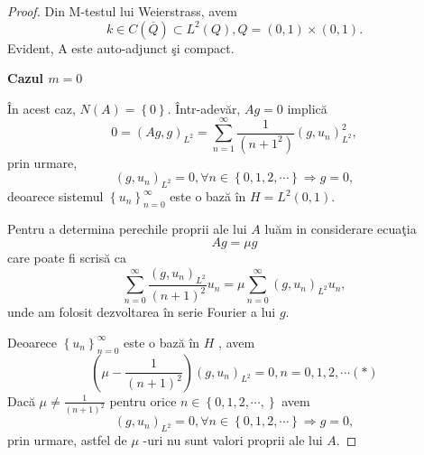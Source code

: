 \documentclass[a4paper,12pt,oneside]{report}
\begin{document}
\begin{proof}
Din M-testul lui Weierstrass, avem
\begin{displaymath}
  k \in C\left ( \overline{Q} \right ) \subset L^{2}\left ( Q \right ), Q = \left ( 0,1 \right )\times \left ( 0,1 \right ).
\end{displaymath}
Evident, A este auto-adjunct \c{s}i compact.

\noindent \textbf{Cazul \(m = 0\)}

\noindent \^{I}n acest caz, \(N\left ( A \right ) = \left \{ 0 \right \}\). \^{I}ntr-adev\u{a}r, \(Ag = 0\) implic\u{a}
\begin{displaymath}
  0 = \left ( Ag,g \right )_{L^{2}} = \sum_{n= 1}^{\infty }\frac{1}{\left ( n+1^{2} \right )}\left ( g , u_{n} \right )_{L^{2}}^{2},
\end{displaymath}
prin urmare,
\begin{displaymath}
  \left ( g,u_{n} \right )_{L^{2}} = 0, \forall n \in \left \{ 0,1,2,\cdots \right \}\Rightarrow g = 0,
\end{displaymath}
deoarece sistemul \(\left \{ u_{n} \right \}_{n=0}^{\infty }\) este o baz\u{a} \^{i}n \(H = L^{2}\left ( 0,1 \right )\).

\noindent Pentru a determina perechile proprii ale lui \(A\) lu\u{a}m in considerare ecua\c{t}ia
\begin{displaymath}
  Ag = \mu g
\end{displaymath}
 care poate fi scris\u{a} ca
\begin{displaymath}
  \sum_{n = 0}^{\infty }\frac{\left ( g, u_{n} \right )_{L^{2}}}{\left ( n+1 \right )^{2}}u_{n} = \mu \sum_{n = 0}^{\infty }\left ( g, u_{n} \right )_{L^{2}}u_{n},
\end{displaymath}
unde am folosit dezvoltarea \^{i}n serie Fourier a lui \(g\). 

Deoarece \(\left \{ u_{n} \right \}_{n = 0}^{\infty }\) este o baz\u{a} \^{i}n \(H\) , avem
\begin{displaymath}
  \left ( \mu  - \frac{1}{\left ( n+1 \right )^{2}} \right )\left ( g,u_{n} \right )_{L^{2}} = 0, n = 0,1,2,\cdots (*)
\end{displaymath}
Dac\u{a} \(\mu \neq \frac{1}{\left ( n+1 \right )^{2}}\) pentru orice \(n\in \left \{ 0,1,2,\cdots, \right \}\) avem
\begin{displaymath}
  \left ( g,u_{n} \right )_{L^{2}} = 0, \forall n\in \left \{ 0,1,2,\cdots \right \}\Rightarrow g = 0,
\end{displaymath}
prin urmare, astfel de  \(\mu\)  -uri nu sunt valori proprii ale lui \(A\). 


\end{proof}
\end{document}
